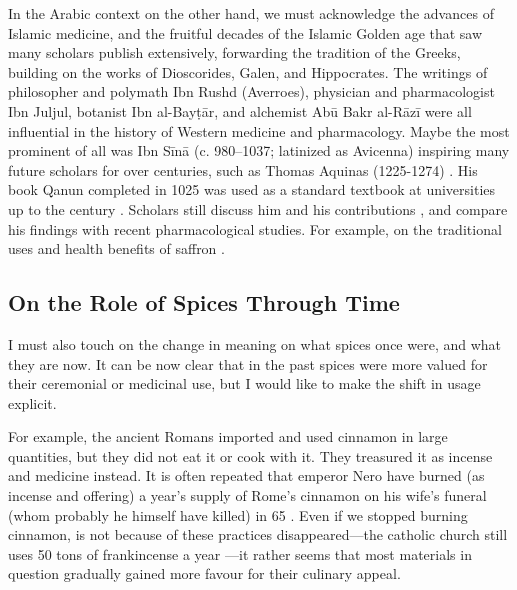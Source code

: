 In the Arabic context on the other hand, we must acknowledge the advances of Islamic medicine, and the fruitful decades of the Islamic Golden age that saw many scholars publish extensively, forwarding the tradition of the Greeks, building on the works of Dioscorides, Galen, and Hippocrates. The writings of philosopher and polymath Ibn Rushd (Averroes), physician and pharmacologist Ibn Juljul, botanist Ibn al-Bayṭār, and alchemist Abū Bakr al-Rāzī were all influential in the history of Western medicine and pharmacology. Maybe the most prominent of all was Ibn Sīnā (c. 980--1037; latinized as Avicenna) inspiring many future scholars for over centuries, such as Thomas Aquinas (1225-1274) \autocite{smith_avicenna_1980}. His book \gls{Qanun} completed in 1025 was used as a standard textbook at universities up to the  century \autocite{musallam_avicenna_1987}. Scholars still discuss him and his contributions \autocite{sajadi_ibn_2009}, and compare his findings with recent pharmacological studies. For example, on the traditional uses and health benefits of saffron \autocite[see][]{hosseinzadeh_avicennas_2013}.

\subsection{On the Role of Spices Through Time}
\label{shift}

I must also touch on the change in meaning on what spices once were, and what they are now. It can be now clear that in the past spices were more valued for their ceremonial or medicinal use, but I would like to make the shift in usage explicit. 

For example, the ancient Romans imported and used cinnamon in large quantities, but they did not eat it or cook with it. They treasured it as incense and medicine instead. It is often repeated that emperor Nero have burned (as incense and offering) a year's supply of Rome's cinnamon on his wife's funeral (whom probably he himself have killed) in 65 \AD{} \autocite[437-438]{toussaint-samat_history_2009}. Even if we stopped burning cinnamon, is not because of these practices disappeared---the catholic church still uses 50 tons of frankincense a year \autocite{ash_why_2020}---it rather seems that most materials in question gradually gained more favour for their culinary appeal. 

